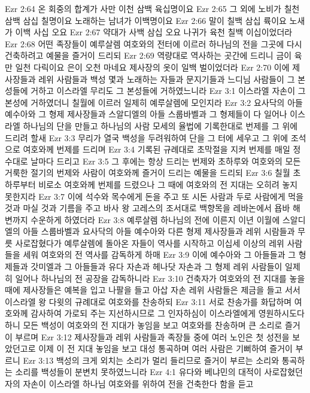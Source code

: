 Ezr 2:64  온 회중의 합계가 사만 이천 삼백 육십명이요
Ezr 2:65  그 외에 노비가 칠천 삼백 삼십 칠명이요 노래하는 남녀가 이백명이요
Ezr 2:66  말이 칠백 삼십 륙이요 노새가 이백 사십 오요
Ezr 2:67  약대가 사백 삼십 오요 나귀가 육천 칠백 이십이었더라
Ezr 2:68  어떤 족장들이 예루살렘 여호와의 전터에 이르러 하나님의 전을 그곳에 다시 건축하려고 예물을 즐거이 드리되
Ezr 2:69  역량대로 역사하는 곳간에 드리니 금이 육만 일천 다릭이요 은이 오천 마네요 제사장의 옷이 일백 벌이었더라
Ezr 2:70  이에 제사장들과 레위 사람들과 백성 몇과 노래하는 자들과 문지기들과 느디님 사람들이 그 본성들에 거하고 이스라엘 무리도 그 본성들에 거하였느니라
Ezr 3:1  이스라엘 자손이 그 본성에 거하였더니 칠월에 이르러 일제히 예루살렘에 모인지라
Ezr 3:2  요사닥의 아들 예수아와 그 형제 제사장들과 스알디엘의 아들 스룹바벨과 그 형제들이 다 일어나 이스라엘 하나님의 단을 만들고 하나님의 사람 모세의 율법에 기록한대로 번제를 그 위에 드리려 할새
Ezr 3:3  무리가 열국 백성을 두려워하여 단을 그 터에 세우고 그 위에 조석으로 여호와께 번제를 드리며
Ezr 3:4  기록된 규례대로 초막절을 지켜 번제를 매일 정수대로 날마다 드리고
Ezr 3:5  그 후에는 항상 드리는 번제와 초하루와 여호와의 모든 거룩한 절기의 번제와 사람이 여호와께 즐거이 드리는 예물을 드리되
Ezr 3:6  칠월 초하루부터 비로소 여호와께 번제를 드렸으나 그 때에 여호와의 전 지대는 오히려 놓지 못한지라
Ezr 3:7  이에 석수와 목수에게 돈을 주고 또 시돈 사람과 두로 사람에게 먹을 것과 마실 것과 기름을 주고 바사 왕 고레스의 조서대로 백향목을 레바논에서 욥바 해변까지 수운하게 하였더라
Ezr 3:8  예루살렘 하나님의 전에 이른지 이년 이월에 스알디엘의 아들 스룹바벨과 요사닥의 아들 예수아와 다른 형제 제사장들과 레위 시람들과 무릇 사로잡혔다가 예루살렘에 돌아온 자들이 역사를 시작하고 이십세 이상의 레위 사람들을 세워 여호와의 전 역사를 감독하게 하매
Ezr 3:9  이에 예수아와 그 아들들과 그 형제들과 갓미엘과 그 아들들과 유다 자손과 헤나닷 자손과 그 형제 레위 사람들이 일제히 일어나 하나님의 전 공장을 감독하니라
Ezr 3:10  건축자가 여호와의 전 지대를 놓을 때에 제사장들은 예복을 입고 나팔을 들고 아삽 자손 레위 사람들은 제금을 들고 서서 이스라엘 왕 다윗의 규례대로 여호와를 찬송하되
Ezr 3:11  서로 찬송가를 화답하며 여호와께 감사하여 가로되 주는 지선하시므로 그 인자하심이 이스라엘에게 영원하시도다 하니 모든 백성이 여호와의 전 지대가 놓임을 보고 여호와를 찬송하며 큰 소리로 즐거이 부르며
Ezr 3:12  제사장들과 레위 사람들과 족장들 중에 여러 노인은 첫 성전을 보았던고로 이제 이 전 지대 놓임을 보고 대성 통곡하며 여러 사람은 기뻐하여 즐거이 부르니
Ezr 3:13  백성의 크게 외치는 소리가 멀리 들리므로 즐거이 부르는 소리와 통곡하는 소리를 백성들이 분변치 못하였느니라
Ezr 4:1  유다와 베냐민의 대적이 사로잡혔던 자의 자손이 이스라엘 하나님 여호와를 위하여 전을 건축한다 함을 듣고
